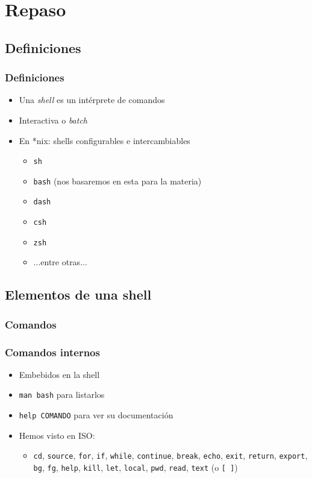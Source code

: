 \section{Repaso}
\subsection{Definiciones}
\begin{frame}
  \frametitle{Definiciones}
  \begin{itemize}
    \item Una \textit{shell} es un intérprete de comandos
    \item Interactiva o \textit{batch}
    \item En *nix: shells configurables e intercambiables
    \begin{itemize}
      \item \texttt{sh}
      \item \texttt{bash} (nos basaremos en esta para la materia)
      \item \texttt{dash}
      \item \texttt{csh}
      \item \texttt{zsh}
      \item ...entre otras...
    \end{itemize}
  \end{itemize}
\end{frame}

\subsection{Elementos de una shell}

\subsubsection{Comandos}

\begin{frame}
  \frametitle{Comandos internos}
  \begin{itemize}
    \item Embebidos en la shell
    \item \texttt{man bash} para listarlos
    \item \texttt{help COMANDO} para ver su documentación
    \item Hemos visto en ISO:
    \begin{itemize}
      \item \texttt{cd}, \texttt{source}, \texttt{for}, \texttt{if}, \texttt{while},
        \texttt{continue}, \texttt{break}, \texttt{echo}, \texttt{exit}, \texttt{return}, \texttt{export},
        \texttt{bg}, \texttt{fg}, \texttt{help}, \texttt{kill}, \texttt{let}, \texttt{local},
        \texttt{pwd}, \texttt{read}, \texttt{text} (o \texttt{[ ]})
    \end{itemize}
  \end{itemize}
\end{frame}


